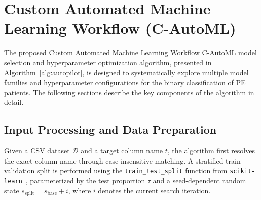 \documentclass[diagnostics,article,submit,pdftex,moreauthors]{Definitions/mdpi}
\begin{document}
\appendixstart
\appendix
\section[\appendixname~\thesection]{Custom Automated Machine Learning
  Workflow (C-AutoML)}
\label{app:c-automl}
The proposed Custom Automated Machine Learning Workflow \ac{C-AutoML}
model selection and hyperparameter optimization algorithm, presented
in Algorithm~\ref{alg:autopilot}, is designed to systematically
explore multiple model families and hyperparameter configurations for
the binary classification of \ac{PE} patients. The following sections
describe the key components of the algorithm in detail.


\subsection[\appendixname~\thesubsection]{Input Processing and Data Preparation}


Given a CSV dataset $\mathcal{D}$ and a target column name $t$, the
algorithm first resolves the exact column name through
case-insensitive matching. A stratified train-validation split is
performed using the \texttt{train\_test\_split} function from
\texttt{scikit-learn}~\cite{sklearn-api}, parameterized by the test
proportion $\tau$ and a seed-dependent random state
$s_{\text{split}} = s_{\text{base}} + i$, where $i$ denotes the
current search iteration.
\end{document}
